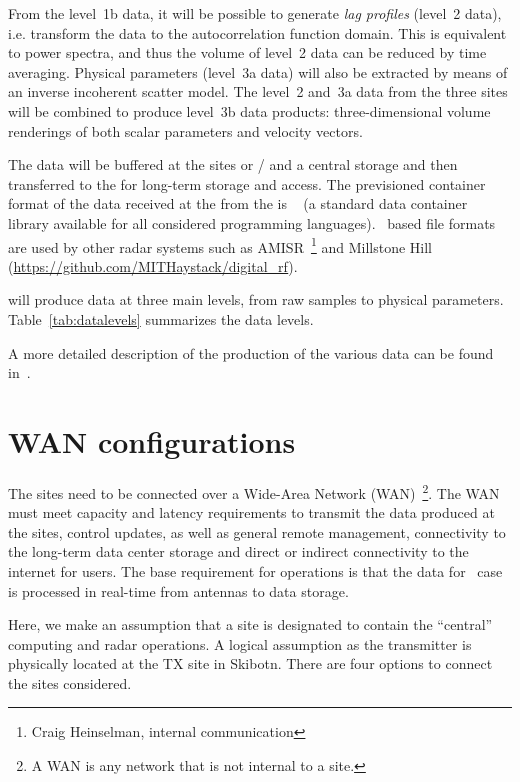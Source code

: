 \documentclass[12pt,a4paper]{article}
\begin{document}
From the level~1b data, it will be possible to generate
\emph{lag profiles} (level~2 data), i.e. transform the data to the autocorrelation function domain. This is equivalent to power spectra, and thus the volume of level~2 data can be reduced by time averaging.
Physical parameters (level~3a data) will also be extracted by means of an inverse incoherent scatter model. 
The level~2 and~3a data from the three sites will be combined to produce level~3b data products: three-dimensional volume renderings of both scalar parameters and velocity vectors.

The data will be buffered at the sites or / and a central storage 
and then transferred to the \DCs for long-term storage and access.
The previsioned container format of the data received at the \DCs from the \OC is \HDF~\cite{hdf}
(a standard data container library available for all considered programming languages). \HDF~based file formats are used by other radar systems such as AMISR~\footnote{Craig Heinselman, internal communication} and Millstone Hill (\url{https://github.com/MITHaystack/digital_rf}).
\fi

\ED will produce data at three main levels, from raw samples to physical parameters. Table~\ref{tab:datalevels} summarizes the \ED data levels.

A more detailed description of the production of the various \ED data can be found in~\cite{e3dds-do1}.

\section{WAN configurations} \label{sec:wan}

The \ED sites need to be connected over a Wide-Area Network (WAN)~\footnote{A WAN is any network that is not internal to a site.}.
The WAN must meet capacity and latency requirements to transmit the data produced at the \ED sites, control updates, as well as general remote management, connectivity to the long-term data center storage and direct or indirect connectivity to the internet for users.
The base requirement for \ED operations is that the data for \NBW\ case is processed in real-time from antennas to data storage.

Here, we make an assumption that a site is designated to contain the ``central'' computing and radar operations. 
A logical assumption as the transmitter is physically located at the TX site in Skibotn.
There are four options to connect the \ED sites considered.
\end{document}
